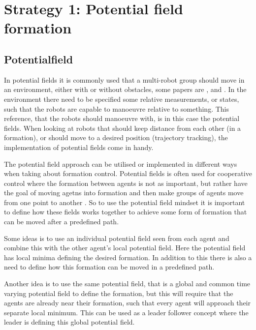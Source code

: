 \section{Strategy 1: Potential field formation}
\label{sc:potential-fields}


\subsection{Potentialfield}
In potential fields it is commonly used that a multi-robot group should move in an environment, either with or without obstacles, some papers are \citep{pfmrm}, \citep{fccsc} and \citep{UAVff3dpf}. In the environment there need to be specified some relative measurements, or states, such that the robots are capable to manoeuvre relative to something. This reference, that the robots should manoeuvre with, is in this case the potential fields. When looking at robots that should keep distance from each other (in a formation), or should move to a desired position (trajectory tracking), the implementation of potential fields come in handy.

The potential field approach can be utilised or implemented in
different ways when taking about formation control. Potential fields
is often used for cooperative control where the formation between
agents is not as important, but rather have the goal of moving agetns into formation and then make groups of
agents move from one point to another \citep{5504176}. So to
use the potential field mindset it is important to define how these
fields works together to achieve some form of formation that can be
moved after a predefined path. 

Some ideas is to use an individual potential field seen from each
agent and combine this with the other agent's local potential field.
Here the potential field has local minima defining the desired
formation. In addition to this there is also a need to define how this
formation can be moved in a predefined path.

Another idea is to use the same potential field, that is a global and
common time varying potential field to define the formation, but this
will require that the agents are already near their formation, such
that every agent will approach their separate local minimum. This can
be used as a leader follower concept where the leader is defining this
global potential field.

